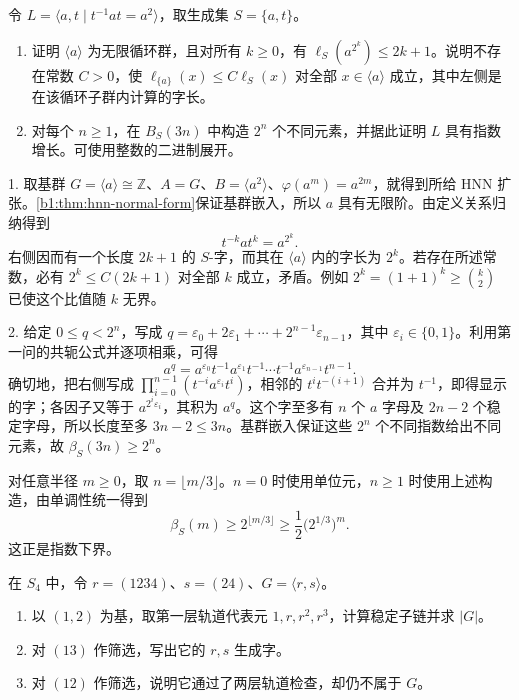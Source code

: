 \begin{exercise}\label{b1:ex:C-hnn-exponential-growth}
	令 \(L=\langle a,t\mid t^{-1}at=a^2\rangle\)，取生成集 \(S=\{a,t\}\)。
	\begin{enumerate}
		\item 证明 \(\langle a\rangle\) 为无限循环群，且对所有 \(k\ge0\)，有 \(\ell_S(a^{2^k})\le2k+1\)。说明不存在常数 \(C>0\)，使 \(\ell_{\{a\}}(x)\le C\ell_S(x)\) 对全部 \(x\in\langle a\rangle\) 成立，其中左侧是在该循环子群内计算的字长。
		\item 对每个 \(n\ge1\)，在 \(B_S(3n)\) 中构造 \(2^n\) 个不同元素，并据此证明 \(L\) 具有指数增长。可使用整数的二进制展开。
	\end{enumerate}
\end{exercise}
\begin{solution}
	1. 取基群 \(G=\langle a\rangle\cong\mathbb Z\)、\(A=G\)、\(B=\langle a^2\rangle\)、\(\varphi(a^m)=a^{2m}\)，就得到所给 HNN 扩张。\cref{b1:thm:hnn-normal-form}保证基群嵌入，所以 \(a\) 具有无限阶。由定义关系归纳得到
	\[
		t^{-k}at^k=a^{2^k}.
	\]
	右侧因而有一个长度 \(2k+1\) 的 \(S\)-字，而其在 \(\langle a\rangle\) 内的字长为 \(2^k\)。若存在所述常数，必有 \(2^k\le C(2k+1)\) 对全部 \(k\) 成立，矛盾。例如 \(2^k=(1+1)^k\ge\binom k2\) 已使这个比值随 \(k\) 无界。

	2. 给定 \(0\le q<2^n\)，写成 \(q=\varepsilon_0+2\varepsilon_1+\cdots+2^{n-1}\varepsilon_{n-1}\)，其中 \(\varepsilon_i\in\{0,1\}\)。利用第一问的共轭公式并逐项相乘，可得
	\[
		a^q=a^{\varepsilon_0}t^{-1}a^{\varepsilon_1}t^{-1}\cdots
		t^{-1}a^{\varepsilon_{n-1}}t^{n-1}.
	\]
	确切地，把右侧写成 \(\prod_{i=0}^{n-1}(t^{-i}a^{\varepsilon_i}t^i)\)，相邻的 \(t^it^{-(i+1)}\) 合并为 \(t^{-1}\)，即得显示的字；各因子又等于 \(a^{2^i\varepsilon_i}\)，其积为 \(a^q\)。这个字至多有 \(n\) 个 \(a\) 字母及 \(2n-2\) 个稳定字母，所以长度至多 \(3n-2\le3n\)。基群嵌入保证这些 \(2^n\) 个不同指数给出不同元素，故 \(\beta_S(3n)\ge2^n\)。

	对任意半径 \(m\ge0\)，取 \(n=\lfloor m/3\rfloor\)。\(n=0\) 时使用单位元，\(n\ge1\) 时使用上述构造，由单调性统一得到
	\[
		\beta_S(m)\ge2^{\lfloor m/3\rfloor}
		\ge\dfrac12\bigl(2^{1/3}\bigr)^m.
	\]
	这正是指数下界。
\end{solution}

\begin{exercise}\label{b1:ex:C-d8-sifting}
	在 \(S_4\) 中，令 \(r=(1234)\)、\(s=(24)\)、\(G=\langle r,s\rangle\)。
	\begin{enumerate}
		\item 以 \((1,2)\) 为基，取第一层轨道代表元 \(1,r,r^2,r^3\)，计算稳定子链并求 \(|G|\)。
		\item 对 \((13)\) 作筛选，写出它的 \(r,s\) 生成字。
		\item 对 \((12)\) 作筛选，说明它通过了两层轨道检查，却仍不属于 \(G\)。
	\end{enumerate}
\end{exercise}

